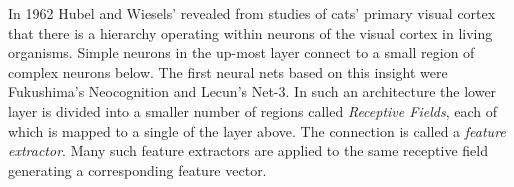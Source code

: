 In 1962 Hubel and Wiesels' revealed from studies of cats' primary visual cortex\citep{lecun1995convolutional}\citep{bengio2009advances}\citep{goyal2014object} that there is a hierarchy operating within neurons of the visual cortex in living organisms.
Simple neurons in the up-most layer connect to a small region of complex neurons below\citep{gabor1946theory}.
The first neural nets based on this insight were Fukushima's Neocognition and Lecun's Net-3\citep{bengio2009advances}.
In such an architecture the lower layer is divided into a smaller number of regions called \textit{Receptive Fields}, each of which is mapped to a single of the layer above\citep{bengio2009advances}.
The connection is called a \textit{feature extractor}.
Many such feature extractors are applied to the same receptive field generating a corresponding feature vector.

